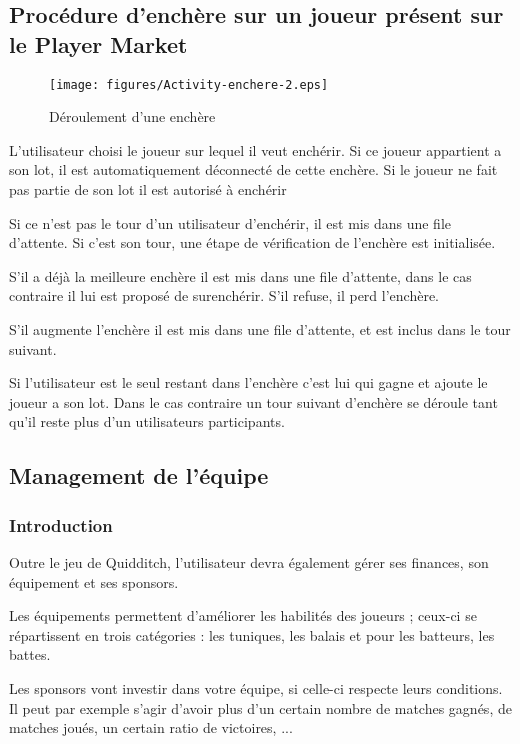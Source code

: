 \subsection{Procédure d'enchère sur un joueur présent sur le Player Market}
\begin{figure}[h!]
  \centering
  \texttt{[image: figures/Activity-enchere-2.eps]}
  \caption{\label{fig:Enchere} Déroulement d'une enchère}
\end{figure}
\begin{list}{}{\leftmargin=1.5em}
\item{L'utilisateur choisi le joueur sur lequel il veut enchérir. Si ce joueur appartient a son lot, il est automatiquement déconnecté de cette enchère. Si le joueur ne fait pas partie de son lot il est autorisé à enchérir}
\item{Si ce n'est pas  le tour d'un utilisateur d'enchérir, il est mis dans une file d'attente. Si c'est son tour, une étape de vérification de l'enchère est initialisée.}
\item{S'il a déjà la meilleure enchère il est mis dans une file d'attente, dans le cas contraire il lui est proposé de surenchérir. S'il refuse, il perd l'enchère.}
\item{S'il augmente l'enchère il est mis dans une file d'attente, et est inclus dans le tour suivant.}
\item{Si l'utilisateur est le seul restant dans l'enchère c'est lui qui gagne et ajoute le joueur a son lot. Dans le cas contraire un tour suivant d'enchère se déroule tant qu'il reste plus d'un utilisateurs participants.}
\subsection{Management de l'équipe}

\subsubsection{Introduction}
Outre le jeu de Quidditch, l'utilisateur devra également gérer ses finances, son équipement et ses sponsors.

Les équipements permettent d'améliorer les habilités des joueurs ; ceux-ci se répartissent en trois catégories : les tuniques, les balais et pour les batteurs, les battes.

Les sponsors vont investir dans votre équipe, si celle-ci respecte leurs conditions. Il peut par exemple s'agir d'avoir plus d'un certain nombre de matches gagnés, de matches joués, un certain ratio de victoires, ...


\end{list}

